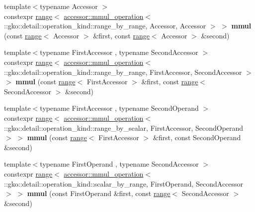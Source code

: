 \begin{DoxyCompactItemize}
\item 
\mbox{\label{namespacegko_af25a3968d03816b31d07e8f45499796d}} 
{\footnotesize template$<$typename Accessor $>$ }\\constexpr \hyperlink{classgko_1_1range}{range}$<$ \hyperlink{structgko_1_1accessor_1_1mmul__operation}{accessor\+::mmul\+\_\+operation}$<$ \+::gko\+::detail\+::operation\+\_\+kind\+::range\+\_\+by\+\_\+range, Accessor, Accessor $>$ $>$ {\bfseries mmul} (const \hyperlink{classgko_1_1range}{range}$<$ Accessor $>$ \&first, const \hyperlink{classgko_1_1range}{range}$<$ Accessor $>$ \&second)
\item 
\mbox{\label{namespacegko_a821da786ceea22fbd7b3c259feef2ac2}} 
{\footnotesize template$<$typename First\+Accessor , typename Second\+Accessor $>$ }\\constexpr \hyperlink{classgko_1_1range}{range}$<$ \hyperlink{structgko_1_1accessor_1_1mmul__operation}{accessor\+::mmul\+\_\+operation}$<$ \+::gko\+::detail\+::operation\+\_\+kind\+::range\+\_\+by\+\_\+range, First\+Accessor, Second\+Accessor $>$ $>$ {\bfseries mmul} (const \hyperlink{classgko_1_1range}{range}$<$ First\+Accessor $>$ \&first, const \hyperlink{classgko_1_1range}{range}$<$ Second\+Accessor $>$ \&second)
\item 
\mbox{\label{namespacegko_a0eb6555448ea2dc4bcd3004eb7fa6479}} 
{\footnotesize template$<$typename First\+Accessor , typename Second\+Operand $>$ }\\constexpr \hyperlink{classgko_1_1range}{range}$<$ \hyperlink{structgko_1_1accessor_1_1mmul__operation}{accessor\+::mmul\+\_\+operation}$<$ \+::gko\+::detail\+::operation\+\_\+kind\+::range\+\_\+by\+\_\+scalar, First\+Accessor, Second\+Operand $>$ $>$ {\bfseries mmul} (const \hyperlink{classgko_1_1range}{range}$<$ First\+Accessor $>$ \&first, const Second\+Operand \&second)
\item 
\mbox{\label{namespacegko_a2193d82004fe19f7fa1d9441e7e179c1}} 
{\footnotesize template$<$typename First\+Operand , typename Second\+Accessor $>$ }\\constexpr \hyperlink{classgko_1_1range}{range}$<$ \hyperlink{structgko_1_1accessor_1_1mmul__operation}{accessor\+::mmul\+\_\+operation}$<$ \+::gko\+::detail\+::operation\+\_\+kind\+::scalar\+\_\+by\+\_\+range, First\+Operand, Second\+Accessor $>$ $>$ {\bfseries mmul} (const First\+Operand \&first, const \hyperlink{classgko_1_1range}{range}$<$ Second\+Accessor $>$ \&second)

\end{DoxyCompactItemize}
